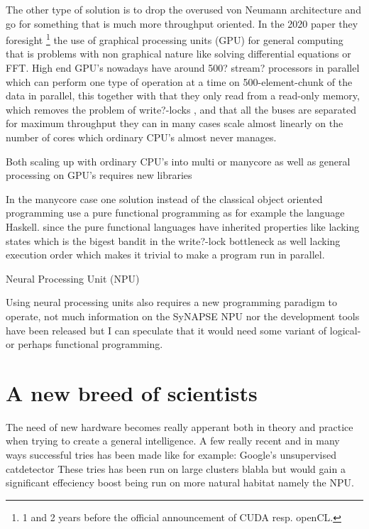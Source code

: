 \documentclass{article}
\begin{document}
    The other type of solution is to drop the overused von Neumann architecture
    and go for something that is much more throughput oriented. In the 2020
    paper\cite{ms2020} they foresight
    \footnote{1 and 2 years before the official 
    announcement of CUDA resp. openCL.} 
    the use of graphical processing units
    (GPU) for general computing that is problems with non graphical nature like
    solving differential equations or FFT. High end GPU's nowadays have around
    500? stream? processors in parallel which can perform one type of operation
    at a time on 500-element-chunk of the data in parallel, this together with that they
    only read from a read-only memory, which removes the problem of write?-locks , and that all the buses are separated for
    maximum throughput they can in many cases  scale almost linearly 
    on the number of cores
    which ordinary CPU's almost never manages.

    Both scaling up with ordinary CPU's into multi or manycore as well as
    general processing on GPU's requires new libraries

    In the manycore case one solution instead of the classical object oriented
    programming use a pure functional programming as
    for example the language Haskell.%
    since the pure functional languages 
    have inherited properties like lacking states which is the bigest bandit in
    the write?-lock %
    bottleneck as well lacking execution order which makes it trivial to make a
    program run in parallel.

    Neural Processing Unit (NPU)

    Using neural processing units also requires a new programming paradigm to
    operate, not much information on the SyNAPSE NPU nor the development tools
    have been released but I can speculate that it would need some variant of
    logical- or perhaps functional programming.

\section{A new breed of scientists}
    The need of new hardware becomes really apperant both in
    theory and practice when trying to create a general intelligence.
    A few really recent and in many ways successful tries has been made
    like for example: Google's unsupervised catdetector %
    These tries has been run on large clusters blabla but would gain a
    significant effeciency boost being run on more natural habitat namely the
    NPU. 
\end{document}
